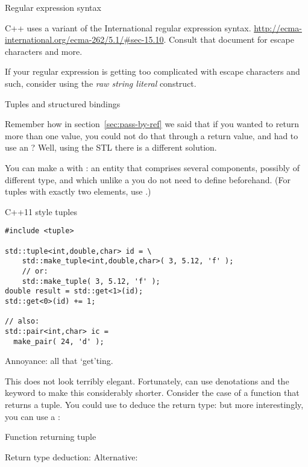 
 {Regular expression syntax}

C++ uses a variant of the  International regular expression syntax.
\url{http://ecma-international.org/ecma-262/5.1/#sec-15.10}.
Consult that document for escape characters and more.

If your regular expression is getting too complicated with escape characters
and such, consider using the
\emph{raw string literal}
construct.

 {Tuples and structured bindings}
\label{sec:tuple}

Remember how in section~\ref{sec:pass-by-ref} we said that if you
wanted to return more than one value, you could not do that through a
return value, and had to use an ?
Well, using the \ac{STL} there is a different solution.

You can make a  with :
an entity that comprises several
components, possibly of different type, and which unlike a
 you do not need to define beforehand.
(For tuples with exactly two elements, use .)

\lstset{style=reviewcode,language=C++}
\begin{block}{C++11 style tuples}
  \label{sl:tuple11}
\begin{lstlisting}
#include <tuple>

std::tuple<int,double,char> id = \
    std::make_tuple<int,double,char>( 3, 5.12, 'f' );
    // or:
    std::make_tuple( 3, 5.12, 'f' );
double result = std::get<1>(id);
std::get<0>(id) += 1;

// also:
std::pair<int,char> ic = 
  make_pair( 24, 'd' );
\end{lstlisting}
Annoyance: all that `get'ting.
\end{block}

This does not look terribly elegant. Fortunately,
 can use denotations and the 
keyword to make this considerably shorter. Consider the case of a
function that returns a tuple. You could use \n{auto} to deduce the
return type:
%
%
but more interestingly, you can use a
:
%

\begin{slide}{Function returning tuple}
  \label{sl:tuplefun}
  \begin{multicols}{2}
    Return type deduction:
    \columnbreak
    Alternative:
  \end{multicols}
\end{slide}

